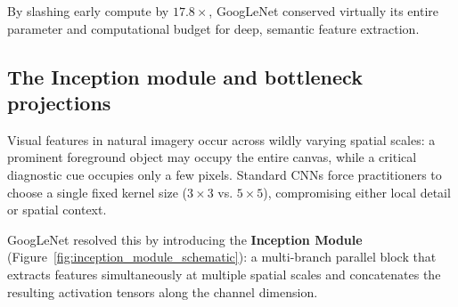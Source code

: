 By slashing early compute by $17.8\times$, GoogLeNet conserved virtually its entire parameter and computational budget for deep, semantic feature extraction.

\subsection{The Inception module and bottleneck projections}
\label{sec:inception_module_bottlenecks}

Visual features in natural imagery occur across wildly varying spatial scales: a prominent foreground object may occupy the entire canvas, while a critical diagnostic cue occupies only a few pixels. Standard CNNs force practitioners to choose a single fixed kernel size ($3 \times 3$ vs. $5 \times 5$), compromising either local detail or spatial context.

GoogLeNet resolved this by introducing the \textbf{Inception Module} (Figure~\ref{fig:inception_module_schematic}): a multi-branch parallel block that extracts features simultaneously at multiple spatial scales and concatenates the resulting activation tensors along the channel dimension.

